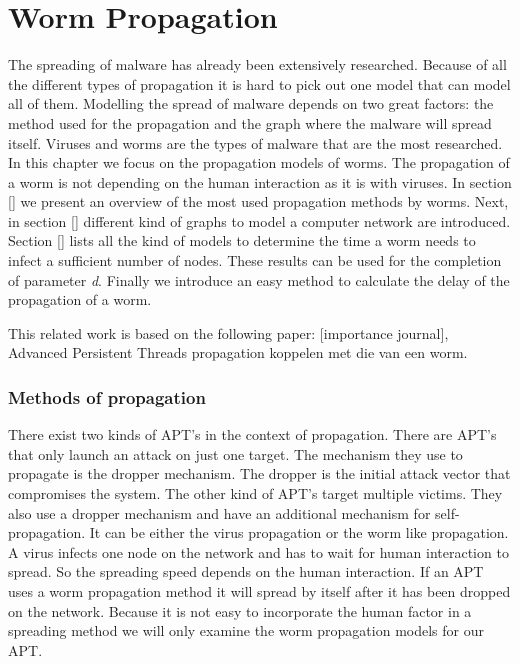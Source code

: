 \chapter{Worm Propagation }
\label{chapter4: Worm propagation}



The spreading of malware has already been extensively researched. Because of all the different types of propagation it is hard to pick out one model that can model all of them. Modelling the spread of malware depends on two great factors: the method used for the propagation and the graph where the malware will spread itself. Viruses and worms are the types of malware that are the most researched. \\
In this chapter we focus on the propagation models of worms. The propagation of a worm is not depending on the human interaction as it is with viruses. In section [] we present an overview of the most used propagation methods by worms. Next, in section [] different kind of graphs to model a computer network are introduced. Section [] lists all the kind of models to determine the time a worm needs to infect a sufficient number of nodes. These results can be used for the completion of parameter \textit{d}. Finally we introduce an easy method to calculate the delay of the propagation of a worm. 

This related work is based on the following paper: [importance journal], 
Advanced Persistent Threads propagation koppelen met die van een worm.

\subsection{Methods of propagation}

There exist two kinds of APT's in the context of propagation. There are APT's that only launch an attack on just one target. The mechanism they use to propagate is the dropper mechanism. The dropper is the initial attack vector that compromises the system. The other kind of APT's target multiple victims. They also use a dropper mechanism and have an additional mechanism for self-propagation. It can be either the virus propagation or the worm like propagation. A virus infects one node on the network and has to wait for human interaction to spread. So the spreading speed depends on the human interaction. If an APT uses a worm propagation method it will spread by itself after it has been dropped on the network. Because it is not easy to incorporate the human factor in a spreading method we will only examine the worm propagation models for our APT. \\

